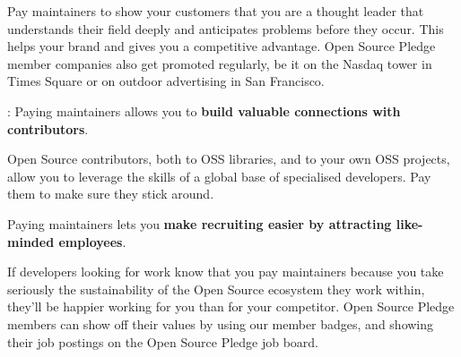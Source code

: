 \begin{multicols}{2}
Pay maintainers to show your customers that you are a thought leader that understands their field deeply and anticipates
problems before they occur. This helps your brand and gives you a competitive advantage. Open Source Pledge member
companies also get promoted regularly, be it on the Nasdaq tower in Times Square or on outdoor advertising in San
Francisco.

\vspace{3mm}

: Paying maintainers allows you to \textbf{build valuable connections with contributors}.

Open Source contributors, both to OSS libraries, and to your own OSS projects, allow you to leverage the skills of a
global base of specialised developers. Pay them to make sure they stick around.

\vspace{3mm}

 Paying maintainers lets you \textbf{make recruiting easier by attracting like-minded employees}.

If developers looking for work know that you pay maintainers because you take seriously the sustainability of the Open
Source ecosystem they work within, they'll be happier working for you than for your competitor. Open Source Pledge
members can show off their values by using our member badges, and showing their job postings on the Open Source
Pledge job board.

\vspace{3mm}


\end{multicols}


